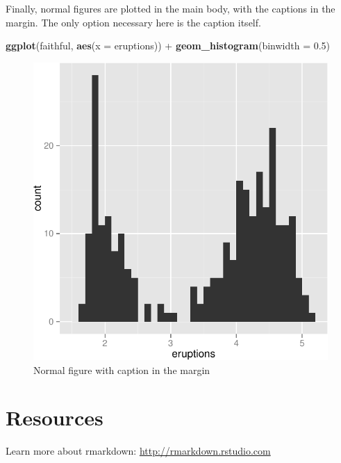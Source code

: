 \documentclass{tufte-handout}
\newenvironment{Shaded}{}{}
\newcommand{\KeywordTok}[1]{\textcolor[rgb]{0.00,0.44,0.13}{\textbf{{#1}}}}
\newcommand{\DataTypeTok}[1]{\textcolor[rgb]{0.56,0.13,0.00}{{#1}}}
\newcommand{\FloatTok}[1]{\textcolor[rgb]{0.25,0.63,0.44}{{#1}}}
\newcommand{\StringTok}[1]{\textcolor[rgb]{0.25,0.44,0.63}{{#1}}}
\newcommand{\NormalTok}[1]{{#1}}
\begin{document}
Finally, normal figures are plotted in the main body, with the captions
in the margin. The only option necessary here is the caption itself.

\begin{Shaded}
\begin{Highlighting}[]
\KeywordTok{ggplot}\NormalTok{(faithful, }\KeywordTok{aes}\NormalTok{(}\DataTypeTok{x =} \NormalTok{eruptions)) +}\StringTok{ }\KeywordTok{geom_histogram}\NormalTok{(}\DataTypeTok{binwidth =} \FloatTok{0.5}\NormalTok{)}
\end{Highlighting}
\end{Shaded}

\begin{figure}
 \includegraphics{./pindex_files/figure-latex/fig3}
\caption{ Normal figure with caption in the margin }
\end{figure}

\section{Resources}\label{resources}

Learn more about rmarkdown: \url{http://rmarkdown.rstudio.com}
\end{document}
